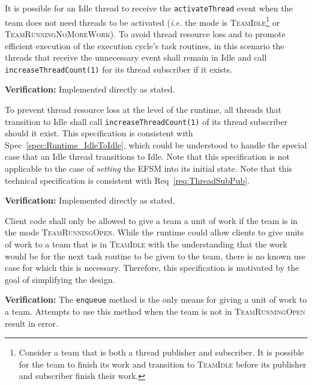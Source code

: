 \documentclass{article}
\newcommand{\TeamIdle}          {\textsc{TeamIdle}}
\newcommand{\TeamRunningOpen}   {\textsc{TeamRunningOpen}}
\newcommand{\TeamRunningNoMoreWork} {\textsc{TeamRunningNoMoreWork}}
\newcommand{\taskroutine}        {task routine\xspace}
\newcommand{\taskroutines}       {task routines\xspace}
\begin{document}
\begin{spec}
\label{spec:Runtime_IdleToIdle}
It is possible for an Idle thread to receive the \texttt{activateThread} event
when the team does not need threads to be activated (\textit{i.e.} the mode is
\TeamIdle \footnote{Consider a team that is both a thread publisher and
subscriber.  It is possible for the team to finish its work and transition to
{\TeamIdle} before its publisher and subscriber finish their work.} or
\TeamRunningNoMoreWork).  To avoid thread resource loss and to promote efficient
execution of the execution cycle's \taskroutines, in this scenario the threads that
receive the unnecessary event shall remain in Idle and call
\texttt{increaseThreadCount(1)} for its thread subscriber if it exists.
\end{spec}
\textbf{Verification:}\hspace{0.125in} Implemented directly as stated.

\begin{spec}
\label{spec:Runtime_ForwardThreads}
To prevent thread resource loss at the level of the runtime, all threads that
transition to Idle shall call \texttt{increaseThreadCount(1)} of its thread
subscriber should it exist.  This specification is consistent with
Spec~\ref{spec:Runtime_IdleToIdle}, which could be understood to handle the
special case that an Idle thread transitions to Idle.  Note that this
specification is not applicable to the case of \textit{setting} the EFSM into
its initial state.  Note that this technical specification is consistent with
Req~\ref{req:ThreadSubPub}.
\end{spec}
\textbf{Verification:}\hspace{0.125in} Implemented directly as stated.

\begin{spec}
\label{spec:Runtime_NoEnqueue}
Client code shall only be allowed to give a team a unit of work if the team is
in the mode {\TeamRunningOpen}.  While the runtime could allow clients to give
units of work to a team that is in {\TeamIdle} with the understanding that the
work would be for the next \taskroutine to be given to the team, there is no known use
case for which this is necessary.  Therefore, this specification is motivated by
the goal of simplifying the design.
\end{spec}
\textbf{Verification:}\hspace{0.125in}  The \texttt{enqueue} method is the only
means for giving a unit of work to a team.  Attempts to use this method when the
team is not in {\TeamRunningOpen} result in error.\\
\end{document}

